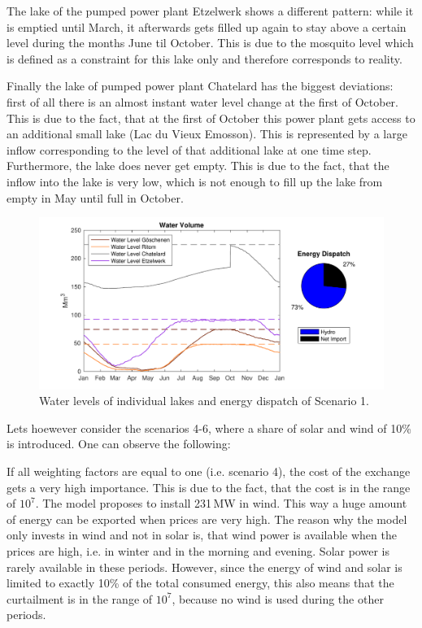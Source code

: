 The lake of the pumped power plant Etzelwerk shows a different pattern: while it is emptied until March, it afterwards gets filled up again to stay above a certain level during the months June til October. This is due to the mosquito level which is defined as a constraint for this lake only and therefore corresponds to reality. 

Finally the lake of pumped power plant Chatelard has the biggest deviations: first of all there is an almost instant water level change at the first of October. This is due to the fact, that at the first of October this power plant gets access to an additional small lake (Lac du Vieux Emosson). This is represented by a large inflow corresponding to the level of that additional lake at one time step. Furthermore, the lake does never get empty. This is due to the fact, that the inflow into the lake is very low, which is not enough to fill up the lake from empty in May until full in October. 

\begin{figure}
    \centering
    \includegraphics[width=\textwidth]{figures/Results/waterlevel_and_energydispatch_scenario1.pdf}
    \caption{Water levels of individual lakes and energy dispatch of Scenario 1.}
    \label{fig:result_water_levels}
\end{figure}

Lets hoewever consider the scenarios 4-6, where a share of solar and wind of 10\%  is introduced. One can observe the following: 

If all weighting factors are equal to one (i.e. scenario 4), the cost of the exchange gets a very high importance. This is due to the fact, that the cost is in the range of $10^7$. The model proposes to install 231\,MW in wind. This way a huge amount of energy can be exported when prices are very high. The reason why the model only invests in wind and not in solar is, that wind power is available when the prices are high, i.e. in winter and in the morning and evening. Solar power is rarely available in these periods. However, since the energy of wind and solar is limited to exactly 10\% of the total consumed energy, this also means that the curtailment is in the range of $10^7$, because no wind is used during the other periods. 

